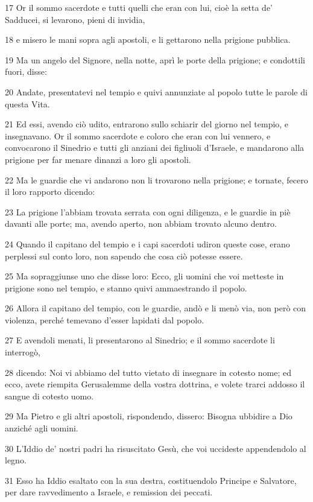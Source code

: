 \par 17 Or il sommo sacerdote e tutti quelli che eran con lui, cioè la setta de' Sadducei, si levarono, pieni di invidia,
\par 18 e misero le mani sopra agli apostoli, e li gettarono nella prigione pubblica.
\par 19 Ma un angelo del Signore, nella notte, aprì le porte della prigione; e condottili fuori, disse:
\par 20 Andate, presentatevi nel tempio e quivi annunziate al popolo tutte le parole di questa Vita.
\par 21 Ed essi, avendo ciò udito, entrarono sullo schiarir del giorno nel tempio, e insegnavano. Or il sommo sacerdote e coloro che eran con lui vennero, e convocarono il Sinedrio e tutti gli anziani dei figliuoli d'Israele, e mandarono alla prigione per far menare dinanzi a loro gli apostoli.
\par 22 Ma le guardie che vi andarono non li trovarono nella prigione; e tornate, fecero il loro rapporto dicendo:
\par 23 La prigione l'abbiam trovata serrata con ogni diligenza, e le guardie in piè davanti alle porte; ma, avendo aperto, non abbiam trovato alcuno dentro.
\par 24 Quando il capitano del tempio e i capi sacerdoti udiron queste cose, erano perplessi sul conto loro, non sapendo che cosa ciò potesse essere.
\par 25 Ma sopraggiunse uno che disse loro: Ecco, gli uomini che voi metteste in prigione sono nel tempio, e stanno quivi ammaestrando il popolo.
\par 26 Allora il capitano del tempio, con le guardie, andò e li menò via, non però con violenza, perché temevano d'esser lapidati dal popolo.
\par 27 E avendoli menati, li presentarono al Sinedrio; e il sommo sacerdote li interrogò,
\par 28 dicendo: Noi vi abbiamo del tutto vietato di insegnare in cotesto nome; ed ecco, avete riempita Gerusalemme della vostra dottrina, e volete trarci addosso il sangue di cotesto uomo.
\par 29 Ma Pietro e gli altri apostoli, rispondendo, dissero: Bisogna ubbidire a Dio anziché agli uomini.
\par 30 L'Iddio de' nostri padri ha risuscitato Gesù, che voi uccideste appendendolo al legno.
\par 31 Esso ha Iddio esaltato con la sua destra, costituendolo Principe e Salvatore, per dare ravvedimento a Israele, e remission dei peccati.
